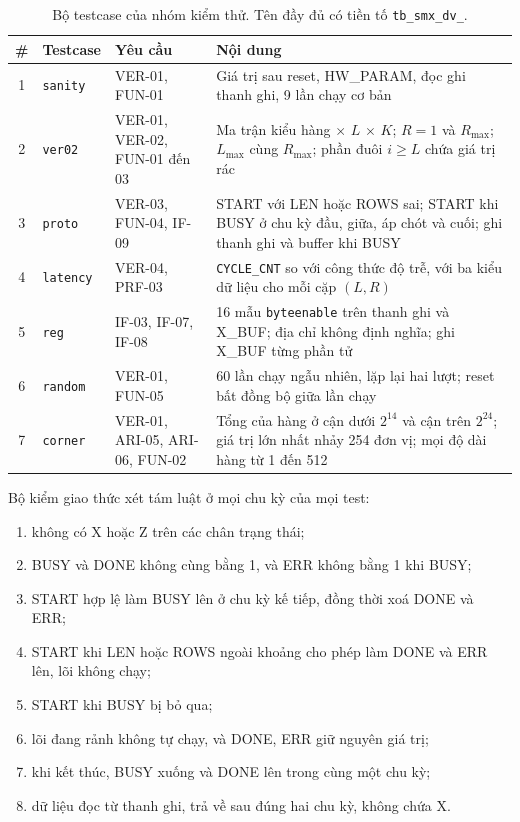 \begin{table}[htbp]
\centering
\small
\begin{tabular}{clp{2.8cm}p{7.0cm}}
\toprule
\# & Testcase & Yêu cầu & Nội dung \\
\midrule
1 & \texttt{sanity}  & VER-01, FUN-01 & Giá trị sau reset, HW\_PARAM, đọc ghi thanh ghi, 9 lần chạy cơ bản \\
2 & \texttt{ver02}   & VER-01, VER-02, FUN-01 đến 03 & Ma trận kiểu hàng $\times$ $L$ $\times$ $K$; $R = 1$ và $R_{\max}$; $L_{\max}$ cùng $R_{\max}$; phần đuôi $i \ge L$ chứa giá trị rác \\
3 & \texttt{proto}   & VER-03, FUN-04, IF-09 & START với LEN hoặc ROWS sai; START khi BUSY ở chu kỳ đầu, giữa, áp chót và cuối; ghi thanh ghi và buffer khi BUSY \\
4 & \texttt{latency} & VER-04, PRF-03 & \texttt{CYCLE\_CNT} so với công thức độ trễ, với ba kiểu dữ liệu cho mỗi cặp $(L, R)$ \\
5 & \texttt{reg}     & IF-03, IF-07, IF-08 & 16 mẫu \texttt{byteenable} trên thanh ghi và X\_BUF; địa chỉ không định nghĩa; ghi X\_BUF từng phần tử \\
6 & \texttt{random}  & VER-01, FUN-05 & 60 lần chạy ngẫu nhiên, lặp lại hai lượt; reset bất đồng bộ giữa lần chạy \\
7 & \texttt{corner}  & VER-01, ARI-05, ARI-06, FUN-02 & Tổng của hàng ở cận dưới $2^{14}$ và cận trên $2^{24}$; giá trị lớn nhất nhảy 254 đơn vị; mọi độ dài hàng từ 1 đến 512 \\
\bottomrule
\end{tabular}
\caption{Bộ testcase của nhóm kiểm thử. Tên đầy đủ có tiền tố \texttt{tb\_smx\_dv\_}.}
\label{tab:dv-tests}
\end{table}

Bộ kiểm giao thức xét tám luật ở mọi chu kỳ của mọi test:
\begin{enumerate}
  \item không có X hoặc Z trên các chân trạng thái;
  \item BUSY và DONE không cùng bằng 1, và ERR không bằng 1 khi BUSY;
  \item START hợp lệ làm BUSY lên ở chu kỳ kế tiếp, đồng thời xoá DONE và ERR;
  \item START khi LEN hoặc ROWS ngoài khoảng cho phép làm DONE và ERR lên, lõi không chạy;
  \item START khi BUSY bị bỏ qua;
  \item lõi đang rảnh không tự chạy, và DONE, ERR giữ nguyên giá trị;
  \item khi kết thúc, BUSY xuống và DONE lên trong cùng một chu kỳ;
  \item dữ liệu đọc từ thanh ghi, trả về sau đúng hai chu kỳ, không chứa X.
\end{enumerate}

